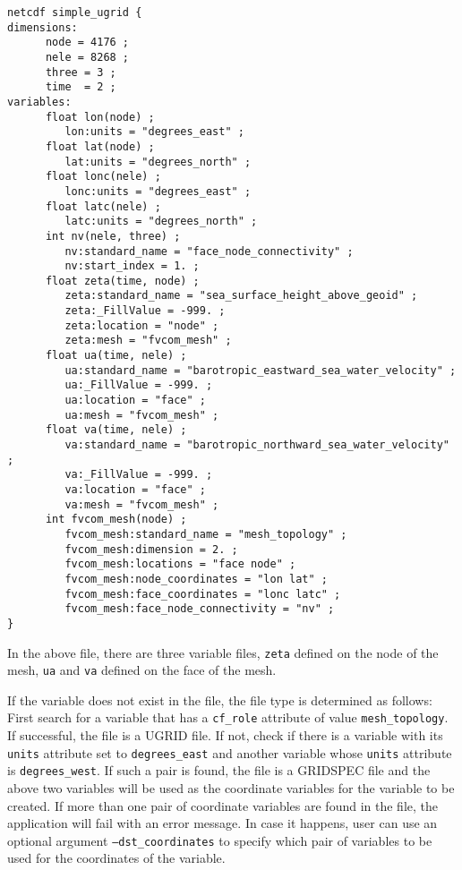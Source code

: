 \label{ugridexample}
\begin{verbatim}
netcdf simple_ugrid {
dimensions:
      node = 4176 ; 
      nele = 8268 ;
      three = 3 ;
      time  = 2 ;
variables:
      float lon(node) ;
         lon:units = "degrees_east" ;
      float lat(node) ;
         lat:units = "degrees_north" ;
      float lonc(nele) ;
         lonc:units = "degrees_east" ;
      float latc(nele) ;
         latc:units = "degrees_north" ;
      int nv(nele, three) ;
         nv:standard_name = "face_node_connectivity" ;
         nv:start_index = 1. ;
      float zeta(time, node) ;
         zeta:standard_name = "sea_surface_height_above_geoid" ;
         zeta:_FillValue = -999. ;
         zeta:location = "node" ;
         zeta:mesh = "fvcom_mesh" ;
      float ua(time, nele) ;
         ua:standard_name = "barotropic_eastward_sea_water_velocity" ;
         ua:_FillValue = -999. ;
         ua:location = "face" ;
         ua:mesh = "fvcom_mesh" ;
      float va(time, nele) ;
         va:standard_name = "barotropic_northward_sea_water_velocity" ;
         va:_FillValue = -999. ;
         va:location = "face" ;
         va:mesh = "fvcom_mesh" ;
      int fvcom_mesh(node) ;
         fvcom_mesh:standard_name = "mesh_topology" ;
         fvcom_mesh:dimension = 2. ;
         fvcom_mesh:locations = "face node" ;
         fvcom_mesh:node_coordinates = "lon lat" ;
         fvcom_mesh:face_coordinates = "lonc latc" ;
         fvcom_mesh:face_node_connectivity = "nv" ;
}
\end{verbatim}

In the above file, there are three variable files, {\tt zeta} defined on the node of the mesh, {\tt ua} and
{\tt va} defined on the face of the mesh.  

If the variable does not exist in the file, the file type is determined as follows:  
First search for a variable that has a {\tt cf\_role} attribute of value {\tt mesh\_topology}.  If successful,
the file is a UGRID file.  If not, check if there is a variable with its {\tt units} attribute set to {\tt degrees\_east} and another variable whose {\tt units} attribute is {\tt degrees\_west}.  If such a pair is found, 
the file is a GRIDSPEC file and the above two variables will be used as the coordinate variables for the 
variable to be created.  If more than one pair of coordinate variables are found in the file, the application 
will fail with an error message.  In case it happens, user can use an optional argument 
{\tt --dst\_coordinates} to specify which pair of variables to be used for the coordinates of the variable.

